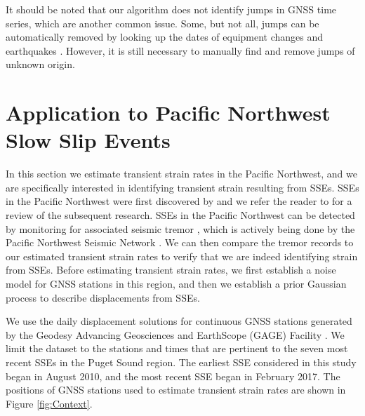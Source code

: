 \documentclass[extra,mreferee]{gji}
\begin{document}

It should be noted that our algorithm does not identify jumps in GNSS
time series, which are another common issue. Some, but not all, jumps
can be automatically removed by looking up the dates of equipment
changes and earthquakes \citep{Gazeaux2013}. However, it is still
necessary to manually find and remove jumps of unknown origin.


\section{Application to Pacific Northwest Slow Slip Events}\label{sec:Cascadia}


In this section we estimate transient strain rates in the Pacific
Northwest, and we are specifically interested in identifying transient
strain resulting from SSEs. SSEs in the Pacific Northwest were first
discovered by \citet{Dragert2001} and we refer the reader to
\citet{Schwartz2007} for a review of the subsequent research. SSEs in
the Pacific Northwest can be detected by monitoring for associated
seismic tremor \citep{Rogers2003}, which is actively being done by the
Pacific Northwest Seismic Network \citep{Wech2010}. We can then
compare the tremor records to our estimated transient strain rates to
verify that we are indeed identifying strain from SSEs. Before
estimating transient strain rates, we first establish a noise model
for GNSS stations in this region, and then we establish a prior
Gaussian process to describe displacements from SSEs.


We use the daily displacement solutions for continuous GNSS stations
generated by the Geodesy Advancing Geosciences and EarthScope (GAGE)
Facility \citep{Herring2016}. We limit the dataset to the stations and
times that are pertinent to the seven most recent SSEs in the Puget
Sound region. The earliest SSE considered in this study began in
August 2010, and the most recent SSE began in February 2017. The
positions of GNSS stations used to estimate transient strain rates are
shown in Figure \ref{fig:Context}.
\end{document}
